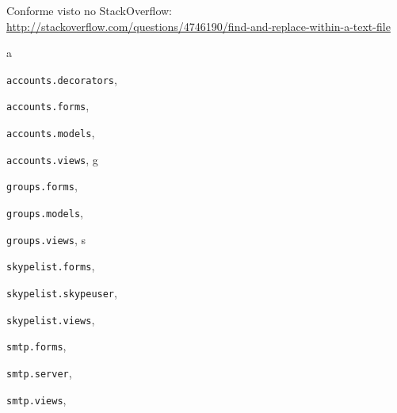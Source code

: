 \documentclass[letterpaper,10pt,brazil]{sphinxmanual}
\begin{document}
Conforme visto no StackOverflow:
\href{http://stackoverflow.com/questions/4746190/find-and-replace-within-a-text-file}{http://stackoverflow.com/questions/4746190/find-and-replace-within-a-text-file}


\renewcommand{\indexname}{Índice de Módulos do Python}
\begin{theindex}
\def\bigletter#1{{\Large\sffamily#1}\nopagebreak\vspace{1mm}}
\bigletter{a}
\item {\texttt{accounts.decorators}}, \pageref{apps/accounts:module-accounts.decorators}
\item {\texttt{accounts.forms}}, \pageref{apps/accounts:module-accounts.forms}
\item {\texttt{accounts.models}}, \pageref{apps/accounts:module-accounts.models}
\item {\texttt{accounts.views}}, \pageref{apps/accounts:module-accounts.views}
\indexspace
\bigletter{g}
\item {\texttt{groups.forms}}, \pageref{apps/groups:module-groups.forms}
\item {\texttt{groups.models}}, \pageref{apps/groups:module-groups.models}
\item {\texttt{groups.views}}, \pageref{apps/groups:module-groups.views}
\indexspace
\bigletter{s}
\item {\texttt{skypelist.forms}}, \pageref{apps/skypelist:module-skypelist.forms}
\item {\texttt{skypelist.skypeuser}}, \pageref{apps/skypelist:module-skypelist.skypeuser}
\item {\texttt{skypelist.views}}, \pageref{apps/skypelist:module-skypelist.views}
\item {\texttt{smtp.forms}}, \pageref{apps/smtp:module-smtp.forms}
\item {\texttt{smtp.server}}, \pageref{apps/smtp:module-smtp.server}
\item {\texttt{smtp.views}}, \pageref{apps/smtp:module-smtp.views}
\end{theindex}

\renewcommand{\indexname}{Índice}
\printindex
\end{document}
